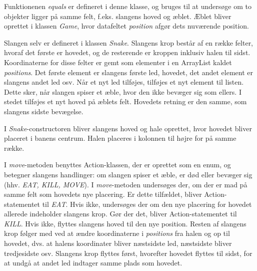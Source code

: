 Funktionenen \textit{equals} er defineret i denne klasse, og bruges til at undersøge om to objekter ligger på samme felt, f.eks. slangens hoved og æblet. Æblet bliver oprettet i klassen \textit{Game}, hvor datafeltet \textit{position} afgør dets nuværende position.

Slangen selv er defineret i klassen \textit{Snake}. Slangens krop består af en række felter, hvoraf det første er hovedet, og de resterende er kroppen inklusiv halen til sidst. Koordinaterne for disse felter er gemt som elementer i en ArrayList kaldet \textit{positions}. Det første element er slangens første led, hovedet, det andet element er slangens andet led osv. Når et nyt led tilføjes, tilføjes et nyt element til listen. Dette sker, når slangen spiser et æble, hvor den ikke bevæger sig som ellers. I stedet tilføjes et nyt hoved på æblets felt. Hovedets retning er den samme, som slangens sidste bevægelse.

I \textit{Snake}-constructoren bliver slangens hoved og hale oprettet, hvor hovedet bliver placeret i banens centrum. Halen placeres i kolonnen til højre for på samme række.

I \textit{move}-metoden benyttes Action-klassen, der er oprettet som en enum, og betegner slangens handlinger: om slangen spiser et æble, er død eller bevæger sig (hhv. \textit{EAT, KILL, MOVE}). I \textit{move}-metoden undersøges der, om der er mad på samme felt som hovedets nye placering. Er dette tilfældet, bliver Action-statementet til \textit{EAT}. Hvis ikke, undersøges der om den nye placering for hovedet allerede indeholder slangens krop. Gør der det, bliver Action-statementet til \textit{KILL}. Hvis ikke, flyttes slangens hoved til den nye position. Resten af slangens krop følger med ved at ændre koordinaterne i \textit{positions} fra halen og op til hovedet, dvs. at halens koordinater bliver næstsidste led, næstsidste bliver tredjesidste osv. Slangens krop flyttes først, hvorefter hovedet flyttes til sidst, for at undgå at andet led indtager samme plads som hovedet.

